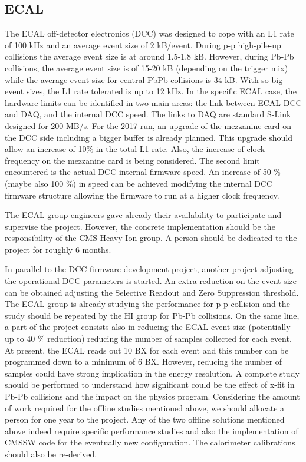 \subsection{ECAL\label{subsec:ECAL}} 
The ECAL off-detector electronics (DCC) was designed to cope with an L1 rate of 100 kHz and an average event size of 2 kB/event. During p-p high-pile-up collisions the average event size is at around 1.5-1.8 kB. However, during Pb-Pb collisions, the average event size is of 15-20 kB (depending on the trigger mix) while the average event size for central PbPb collisions is 34 kB. With so big event sizes, the L1 rate tolerated is up to 12 kHz. In the specific ECAL case, the hardware limits can be identified in two main areas: the link between ECAL DCC and DAQ, and the internal DCC speed. The links to DAQ are standard S-Link designed for 200 MB/s. For the 2017 run, an upgrade of the mezzanine card on the DCC
side including a bigger buffer is already planned. This upgrade should allow an increase of 10\% in the total L1 rate. Also, the increase of clock frequency on the mezzanine card is being considered. The second limit encountered is the actual DCC internal firmware speed. An increase of 50 \% (maybe also 100 \%) in speed can be achieved modifying the internal DCC firmware structure allowing the firmware to run at a higher clock frequency. 

The ECAL group engineers gave already their availability to participate and supervise the project. However, the concrete implementation should be the responsibility of the CMS Heavy Ion group. A person should be dedicated to the project for roughly 6 months. 

In parallel to the DCC firmware development project, another project adjusting the operational DCC parameters is started. An extra reduction on the event size can be obtained adjusting the Selective Readout and Zero Suppression threshold. The ECAL group is already studying the performance for p-p collision and the study should be repeated by the HI group for Pb-Pb collisions. On the same line, a part of the project consists also in reducing the ECAL event size (potentially up to 40 \% reduction) reducing the number of samples collected for each event. At present, the ECAL reads out 10 BX for each event
and this number can be programmed down to a minimum of 6 BX. However, reducing the number of samples could have strong implication in the energy resolution. A complete study should be performed to understand how significant could be the effect of x-fit in Pb-Pb collisions and the impact on the physics program. Considering the amount of work required for the offline studies mentioned above, we should allocate a person for one year to the project. Any of the two offline solutions mentioned above indeed require specific performance studies and also the implementation of CMSSW code for the eventually new configuration. The calorimeter calibrations should also be re-derived. 




